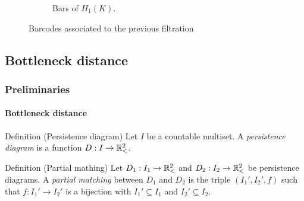 \documentclass[aspectratio=169]{beamer}
\begin{document}
\begin{frame}
\begin{figure}
\begin{subfigure}[b]{0.4\linewidth}
            \caption{Bars of $H_1(K)$.}
        \end{subfigure}
        \caption{Barcodes associated to the previous filtration}
    \end{figure}
\end{frame}

\subsection{Bottleneck distance}

\begin{frame}
  \frametitle{Preliminaries}
  \framesubtitle{Bottleneck distance}

  \begin{block}{Definition (Persistence diagram)}
      Let $ I $ be a countable multiset. A {\it persistence diagram} is a function $ D: I \to \mathbb{R}_<^2 $.
  \end{block}
  \pause
  \begin{block}{Definition (Partial mathing)}
      Let $ D_1: I_1 \to \mathbb{R}_<^2 $ and $ D_2: I_2 \to \mathbb{R}_<^2 $ be persistence diagrams. A {\it partial matching} between $ D_1 $ and $ D_2 $ is the triple $ (I_1', I_2', f) $ such that $ f: I_1' \to I_2' $ is a bijection with $ I_1' \subseteq I_1 $ and $ I_2' \subseteq I_2 $.
  \end{block}

\end{frame}
\end{document}
